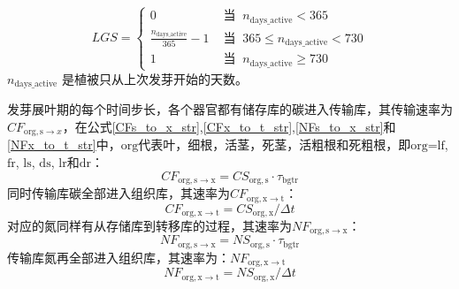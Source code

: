 \begin{equation}
  L G S=\begin{cases}
    0 &  \text{ 当 }\ n_{\mathrm{ {days}}\_{\mathrm{active}}}<365 \\
    \frac{n_{\mathrm{ {days\_{active}}}}}{365}-1 &  \text{ 当 }\ 365 \leqslant n_{\mathrm{ {days }}\_{\mathrm{active}} }<730 \\
    1 & \text{ 当 }\ n_{\mathrm{ {days}}\_{\mathrm{active}}} \geqslant 730
  \end{cases}
\end{equation}
$n_{\mathrm{days\_{active}}}$ 是植被只从上次发芽开始的天数。


发芽展叶期的每个时间步长，各个器官都有储存库的碳进入传输库，其传输速率为$CF_{\mathrm{org,{s}}\rightarrow {x}}$，在公式\eqref{CFs_to_x_str},\eqref{CFx_to_t_str},\eqref{NFs_to_x_str}和\eqref{NFx_to_t_str}中，${\mathrm {org}}$代表叶，细根，活茎，死茎，活粗根和死粗根，即$\text{org=lf}$, ${\mathrm {fr}}$, ${\mathrm {ls}}$, ${\mathrm {ds}}$, ${\mathrm {lr}}$和${\mathrm {dr}}$：
\begin{equation}\label{CFs_to_x_str}
  CF_{\mathrm{org,{s}\rightarrow {x}}}=CS_{\mathrm{org,{s}} }\cdot \tau_{\mathrm{bgtr}}
\end{equation}
同时传输库碳全部进入组织库，其速率为$CF_{\mathrm{org,{x} \rightarrow {t}}}$：
\begin{equation}\label{CFx_to_t_str}
  CF_{\mathrm{org,{x}\rightarrow {t}}}=CS_{\mathrm{org,{x}}}/\Delta t
\end{equation}
对应的氮同样有从存储库到转移库的过程，其速率为$NF_{\mathrm{org,{s}\rightarrow {x}}}$：
\begin{equation}\label{NFs_to_x_str}
  NF_{\mathrm{org,{s}\rightarrow {x}}}=NS_{\mathrm{org,{s}}}\cdot\tau_{\mathrm{bgtr}}
\end{equation}
传输库氮再全部进入组织库，其速率为：$NF_{\mathrm{org,{x} \rightarrow {t}}}$
\begin{equation}\label{NFx_to_t_str}
  NF_{\mathrm{org,{x}\rightarrow {t}}}=NS_{\mathrm{org,{x}}}/\Delta t
\end{equation}


